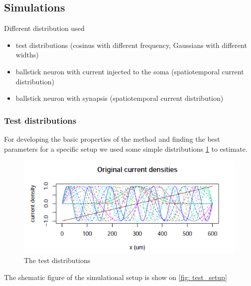 \documentclass[12pt,a4paper]{article}
\begin{document}
\subsection{Simulations}

Different distribution used
\begin{itemize}
\item test distributions (cosinus with different frequency, Gaussians with different widths)
\item ballstick neuron with current injected to the soma (spatiotemporal current distribution)
\item ballstick neuron with synapsis (spatiotemporal current distribution)
\end{itemize}



\subsubsection{Test distributions}
For developing the basic properties of the method and finding the best parameters for a specific setup we used some simple distributions \ref{fig:distribution} to estimate.

\begin{figure}[h]
\centering
\includegraphics[width= 10 cm]{plots/distributions.png}
\caption{The test distributions}
\label{fig:distribution}
\end{figure}




The shematic figure of the simulational setup is show on \ref{fig: test_setup}
\end{document}
